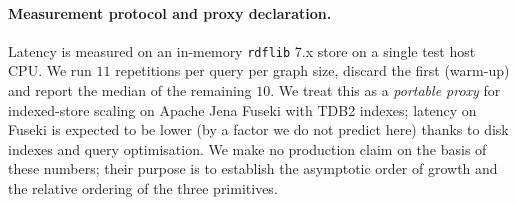\documentclass[futureinternet,article,submit,pdftex,moreauthors]{Definitions/mdpi}
\begin{document}
\paragraph{Measurement protocol and proxy declaration.} Latency is
measured on an in-memory \texttt{rdflib} 7.x store on a single test host
CPU. We run $11$ repetitions per query per graph size, discard the
first (warm-up) and report the median of the remaining $10$. We treat
this as a \emph{portable proxy} for indexed-store scaling on Apache
Jena Fuseki with TDB2 indexes; latency on Fuseki is expected to be
lower (by a factor we do not predict here) thanks to disk indexes and
query optimisation. We make no production claim on the basis of these
numbers; their purpose is to establish the asymptotic order of growth
and the relative ordering of the three primitives.

\begin{table}[t]
\centering
\caption{SPARQL scaling on synthetic SEL-aligned graphs. Latency is the
median of $10$ warm runs per query, measured on an in-memory
\texttt{rdflib} store; $|Q_1|$ and $|Q_3|$ are the bindings returned at
each graph size. The table is auto-generated by
\texttt{scripts/sparql\_scaling.py} on an in-memory
\texttt{rdflib}~7.x store; measurements were regenerated for the current
reproducibility repository state and supersede the earlier draft
numbers.}
\label{tab:sparql-scaling}
\small
{}
\end{table}
\end{document}
